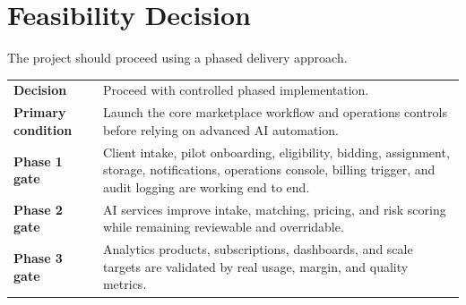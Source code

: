 \documentclass[11pt,a4paper]{article}
\begin{document}
\section{Feasibility Decision}

The project should proceed using a phased delivery approach.

\begin{longtable}{>{\bfseries}p{}p{}}
\toprule
Decision & Proceed with controlled phased implementation. \\
Primary condition & Launch the core marketplace workflow and operations controls before relying on advanced AI automation. \\
Phase 1 gate & Client intake, pilot onboarding, eligibility, bidding, assignment, storage, notifications, operations console, billing trigger, and audit logging are working end to end. \\
Phase 2 gate & AI services improve intake, matching, pricing, and risk scoring while remaining reviewable and overridable. \\
Phase 3 gate & Analytics products, subscriptions, dashboards, and scale targets are validated by real usage, margin, and quality metrics. \\
\bottomrule
\end{longtable}
\end{document}
